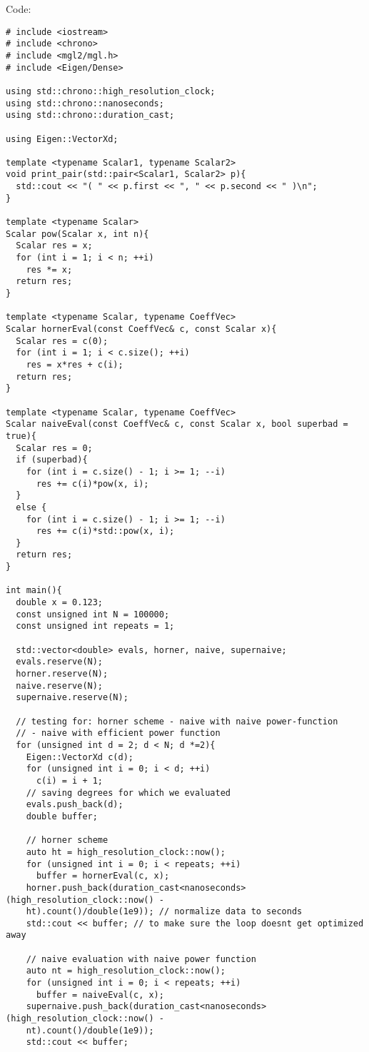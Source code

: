 \documentclass[a4paper]{article}
\begin{document}
Code:
\begin{verbatim}
# include <iostream>
# include <chrono>
# include <mgl2/mgl.h>
# include <Eigen/Dense>

using std::chrono::high_resolution_clock;
using std::chrono::nanoseconds;
using std::chrono::duration_cast;

using Eigen::VectorXd;

template <typename Scalar1, typename Scalar2>
void print_pair(std::pair<Scalar1, Scalar2> p){
  std::cout << "( " << p.first << ", " << p.second << " )\n";
}

template <typename Scalar>
Scalar pow(Scalar x, int n){
  Scalar res = x;
  for (int i = 1; i < n; ++i)
    res *= x;
  return res;
}

template <typename Scalar, typename CoeffVec>
Scalar hornerEval(const CoeffVec& c, const Scalar x){
  Scalar res = c(0);
  for (int i = 1; i < c.size(); ++i)
    res = x*res + c(i);
  return res;
}

template <typename Scalar, typename CoeffVec>
Scalar naiveEval(const CoeffVec& c, const Scalar x, bool superbad = true){
  Scalar res = 0;
  if (superbad){
    for (int i = c.size() - 1; i >= 1; --i)
      res += c(i)*pow(x, i);
  }
  else {
    for (int i = c.size() - 1; i >= 1; --i)
      res += c(i)*std::pow(x, i);
  }
  return res;
}

int main(){
  double x = 0.123;
  const unsigned int N = 100000;
  const unsigned int repeats = 1;

  std::vector<double> evals, horner, naive, supernaive;
  evals.reserve(N);
  horner.reserve(N);
  naive.reserve(N);
  supernaive.reserve(N);

  // testing for: horner scheme - naive with naive power-function
  // - naive with efficient power function
  for (unsigned int d = 2; d < N; d *=2){
    Eigen::VectorXd c(d);
    for (unsigned int i = 0; i < d; ++i)
      c(i) = i + 1;
    // saving degrees for which we evaluated
    evals.push_back(d);
    double buffer;

    // horner scheme
    auto ht = high_resolution_clock::now();
    for (unsigned int i = 0; i < repeats; ++i)
      buffer = hornerEval(c, x);
    horner.push_back(duration_cast<nanoseconds>(high_resolution_clock::now() -
    ht).count()/double(1e9)); // normalize data to seconds
    std::cout << buffer; // to make sure the loop doesnt get optimized away
    
    // naive evaluation with naive power function     
    auto nt = high_resolution_clock::now();
    for (unsigned int i = 0; i < repeats; ++i)
      buffer = naiveEval(c, x);
    supernaive.push_back(duration_cast<nanoseconds>(high_resolution_clock::now() - 
    nt).count()/double(1e9));
    std::cout << buffer;
    

\end{verbatim}
\end{document}
